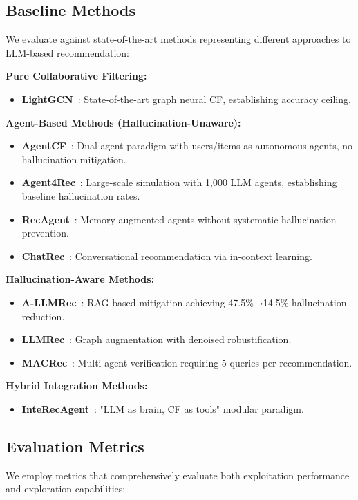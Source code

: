 \documentclass[acmsmall]{acmart}
\begin{document}
\subsection{Baseline Methods}
We evaluate against state-of-the-art methods representing different approaches to LLM-based recommendation:

\textbf{Pure Collaborative Filtering:}
\begin{itemize}
\item \textbf{LightGCN}~\cite{he2020lightgcn}: State-of-the-art graph neural CF, establishing accuracy ceiling.
\end{itemize}

\textbf{Agent-Based Methods (Hallucination-Unaware):}
\begin{itemize}
\item \textbf{AgentCF}~\cite{zhang2024agentcf}: Dual-agent paradigm with users/items as autonomous agents, no hallucination mitigation.
\item \textbf{Agent4Rec}~\cite{zhang2024generative}: Large-scale simulation with 1,000 LLM agents, establishing baseline hallucination rates.
\item \textbf{RecAgent}~\cite{wang2025user}: Memory-augmented agents without systematic hallucination prevention.
\item \textbf{ChatRec}~\cite{gao2023chat}: Conversational recommendation via in-context learning.
\end{itemize}

\textbf{Hallucination-Aware Methods:}
\begin{itemize}
\item \textbf{A-LLMRec}~\cite{li2024allm}: RAG-based mitigation achieving 47.5\%→14.5\% hallucination reduction.
\item \textbf{LLMRec}~\cite{liao2024llmrec}: Graph augmentation with denoised robustification.
\item \textbf{MACRec}~\cite{wang2024macrec}: Multi-agent verification requiring 5 queries per recommendation.
\end{itemize}

\textbf{Hybrid Integration Methods:}
\begin{itemize}
\item \textbf{InteRecAgent}~\cite{liu2023interecagent}: "LLM as brain, CF as tools" modular paradigm.
\end{itemize}
\subsection{Evaluation Metrics}
\label{sec:metrics}
We employ metrics that comprehensively evaluate both exploitation performance and exploration capabilities:
\end{document}

